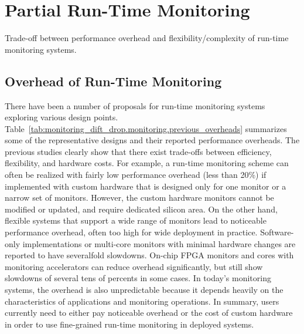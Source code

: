 \section{Partial Run-Time Monitoring}
\label{sec:monitoring_dift_drop.monitoring}

\begin{table}
  \begin{center}
    \begin{tiny}
    
    \end{tiny}
    \caption{Trade-off between performance overhead and flexibility/complexity
    of run-time monitoring systems.}
    \label{tab:monitoring_dift_drop.monitoring.previous_overheads}
  \end{center}
\end{table}

\subsection{Overhead of Run-Time Monitoring}

There have been a number of proposals for run-time monitoring systems exploring
various design points.
Table~\ref{tab:monitoring_dift_drop.monitoring.previous_overheads} summarizes
some of the representative designs and their reported performance overheads.
The previous studies clearly show that there exist trade-offs between
efficiency, flexibility, and hardware costs.  For example, a run-time
monitoring scheme can often be realized with fairly low performance overhead
(less than 20\%) if implemented with custom hardware that is designed only for
one monitor or a narrow set of monitors. However, the custom hardware monitors
cannot be modified or updated, and require dedicated silicon area.  On the
other hand, flexible systems that support a wide range of monitors lead to
noticeable performance overhead, often too high for wide deployment in
practice.  Software-only implementations \cite{nagarajan-interact08,
lift-micro06, purify-usenix92, taintcheck-ndsss05} or multi-core monitors with
minimal hardware changes \cite{lba-asid06} are reported to have severalfold
slowdowns.  On-chip FPGA monitors \cite{flexcore-micro10} and cores with
monitoring accelerators \cite{lba-isca08, fade-hpca14} can reduce overhead
significantly, but still show slowdowns of several tens of percents in some
cases.  In today's monitoring systems, the overhead is also unpredictable
because it depends heavily on the characteristics of applications and
monitoring operations.  In summary, users currently need to either pay
noticeable overhead or the cost of custom hardware in order to use fine-grained
run-time monitoring in deployed systems.

